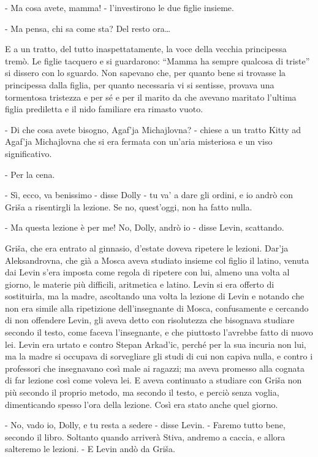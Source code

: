 - Ma cosa avete, mamma! - l'investirono le due figlie insieme. 

- Ma pensa, chi sa come sta? Del resto ora\ldots{} 

E a un tratto, del tutto inaspettatamente, la voce della vecchia principessa tremò. Le figlie tacquero e si guardarono: ``Mamma ha sempre qualcosa di triste'' si dissero con lo sguardo. Non sapevano che, per quanto bene si trovasse la principessa dalla figlia, per quanto necessaria vi si sentisse, provava una tormentosa tristezza e per sé e per il marito da che avevano maritato l'ultima figlia prediletta e il nido familiare era rimasto vuoto. 

- Di che cosa avete bisogno, Agaf'ja Michajlovna? - chiese a un tratto Kitty ad Agaf'ja Michajlovna che si era fermata con un'aria misteriosa e un viso significativo. 

- Per la cena. 
\enlargethispage*{1\baselineskip}

- Sì, ecco, va benissimo - disse Dolly - tu va' a dare gli ordini, e io andrò con Griša a risentirgli la lezione. Se no, quest'oggi, non ha fatto nulla. 

- Ma questa lezione è per me! No, Dolly, andrò io - disse Levin, scattando. 

Griša, che era entrato al ginnasio, d'estate doveva ripetere le lezioni. Dar'ja Aleksandrovna, che già a Mosca aveva studiato insieme col figlio il latino, venuta dai Levin s'era imposta come regola di ripetere con lui, almeno una volta al giorno, le materie più difficili, aritmetica e latino. Levin si era offerto di sostituirla, ma la madre, ascoltando una volta la lezione di Levin e notando che non era simile alla ripetizione dell'insegnante di Mosca, confusamente e cercando di non offendere Levin, gli aveva detto con risolutezza che bisognava studiare secondo il testo, come faceva l'insegnante, e che piuttosto l'avrebbe fatto di nuovo lei. Levin era urtato e contro Stepan Arkad'ic, perché per la sua incuria non lui, ma la madre si occupava di sorvegliare gli studi di cui non capiva nulla, e contro i professori che insegnavano così male ai ragazzi; ma aveva promesso alla cognata di far lezione così come voleva lei. E aveva continuato a studiare con Griša non più secondo il proprio metodo, ma secondo il testo, e perciò senza voglia, dimenticando spesso l'ora della lezione. Così era stato anche quel giorno. 

- No, vado io, Dolly, e tu resta a sedere - disse Levin. - Faremo tutto bene, secondo il libro. Soltanto quando arriverà Stiva, andremo a caccia, e allora salteremo le lezioni. - E Levin andò da Griša. 

